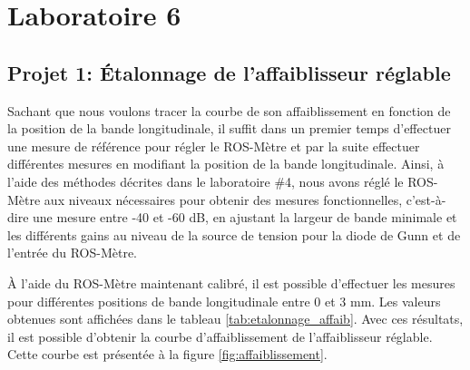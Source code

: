 



\label{s:experimentation}
\chapter{Laboratoire 6}
\section{Projet 1: Étalonnage de l'affaiblisseur réglable}
Sachant que nous voulons tracer la courbe de son affaiblissement en fonction de la position de la bande longitudinale, il suffit dans un premier temps d'effectuer une mesure de référence pour régler le ROS-Mètre et par la suite effectuer différentes mesures en modifiant la position de la bande longitudinale. 
Ainsi, à l'aide des méthodes décrites dans le laboratoire \#4, nous avons réglé le ROS-Mètre aux niveaux nécessaires pour obtenir des mesures fonctionnelles, c'est-à-dire une mesure entre -40 et -60 dB, en ajustant la largeur de bande minimale et les différents gains au niveau de la source de tension pour la diode de Gunn et de l'entrée du ROS-Mètre. 

À l'aide du ROS-Mètre maintenant calibré, il est possible d'effectuer les mesures pour différentes positions de bande longitudinale entre 0 et 3 mm. Les valeurs obtenues sont affichées dans le tableau \ref{tab:etalonnage_affaib}. Avec ces résultats, il est possible d'obtenir la courbe d'affaiblissement de l'affaiblisseur réglable. Cette courbe est présentée à la figure \ref{fig:affaiblissement}.

